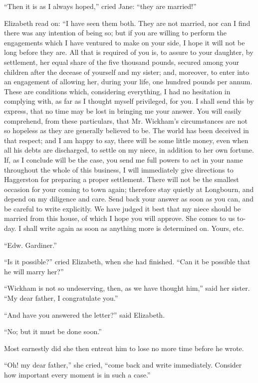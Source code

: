 \documentclass[12pt,openright]{book}
\begin{document}
“Then it is as I always hoped,” cried Jane: “they are married!”

Elizabeth read on: “I have seen them both. They are not married, nor can I find there was any intention of being so; but if you are willing to perform the engagements which I have ventured to make on your side, I hope it will not be long before they are. All that is required of you is, to assure to your daughter, by settlement, her equal share of the five thousand pounds, secured among your children after the decease of yourself and my sister; and, moreover, to enter into an engagement of allowing her, during your life, one hundred pounds per annum. These are conditions which, considering everything, I had no hesitation in complying with, as far as I thought myself privileged, for you. I shall send this by express, that no time may be lost in bringing me your answer. You will easily comprehend, from these particulars, that Mr. Wickham’s circumstances are not so hopeless as they are generally believed to be. The world has been deceived in that respect; and I am happy to say, there will be some little money, even when all his debts are discharged, to settle on my niece, in addition to her own fortune. If, as I conclude will be the case, you send me full powers to act in your name throughout the whole of this business, I will immediately give directions to Haggerston for preparing a proper settlement. There will not be the smallest occasion for your coming to town again; therefore stay quietly at Longbourn, and depend on my diligence and care. Send back your answer as soon as you can, and be careful to write explicitly. We have judged it best that my niece should be married from this house, of which I hope you will approve. She comes to us to-day. I shall write again as soon as anything more is determined on. Yours, etc.

“Edw. Gardiner.”


“Is it possible?” cried Elizabeth, when she had finished. “Can it be possible that he will marry her?”

“Wickham is not so undeserving, then, as we have thought him,” said her sister. “My dear father, I congratulate you.”

“And have you answered the letter?” said Elizabeth.

“No; but it must be done soon.”

Most earnestly did she then entreat him to lose no more time before he wrote.

“Oh! my dear father,” she cried, “come back and write immediately. Consider how important every moment is in such a case.”
\end{document}
